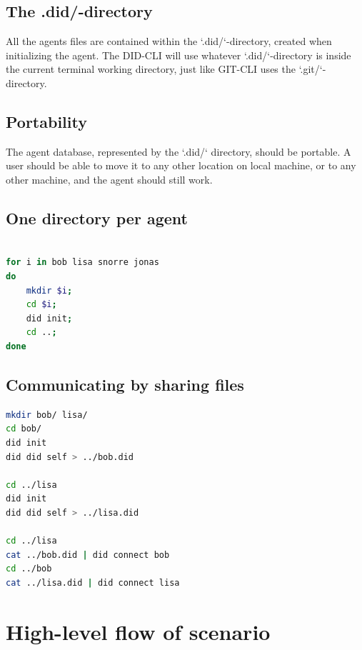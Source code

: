 \subsection{The .did/-directory}

All the agents files are contained within the `.did/`-directory, created when initializing the agent. The DID-CLI will use whatever `.did/`-directory is inside the current terminal working directory, just like GIT-CLI uses the `.git/`-directory.

\subsection{Portability}

The agent database, represented by the `.did/` directory, should be portable. A user should be able to move it to any other location on local machine, or to any other machine, and the agent should still work.


\subsection{One directory per agent}

\begin{lstlisting}[language=bash,caption={bash version}]

for i in bob lisa snorre jonas
do
	mkdir $i;
	cd $i;
	did init;
	cd ..;
done
\end{lstlisting}




\subsection{Communicating by sharing files}

\begin{lstlisting}[language=bash,caption={bash version}]
mkdir bob/ lisa/
cd bob/
did init
did did self > ../bob.did

cd ../lisa
did init
did did self > ../lisa.did

cd ../lisa
cat ../bob.did | did connect bob
cd ../bob
cat ../lisa.did | did connect lisa
\end{lstlisting}



\newpage


\section{High-level flow of scenario}

